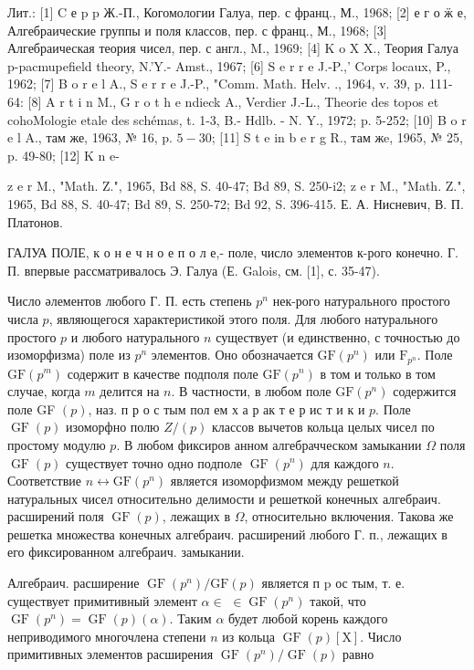 \documentclass[10pt]{article}
\begin{document}
Лит.: [1] C е p p Ж.-П., Когомологии Галуа, пер. с франц., М., 1968; [2] е г о ӝ е, Алгебраические группы и поля классов, пер. с франц., М., 1968; [3] Алгебраическая теория чисел, пер. с англ., M., 1969; [4] K o X X., Теория Галуа p-pacmupefield theory, N.'Y.- Amst., 1967; [6] S e r r e J.-P.,' Corps locaux, P., 1962; [7] B o r e l A., S e r r e J.-P., "Comm. Math. Helv. ., 1964, v. 39, p. 111-64: [8] A r t i n M., G r o t h e ndieck A., Verdier J.-L., Theorie des topos et cohoMologie etale des schémas, t. 1-3, B.- Hdlb. - N. Y., 1972; p. 5-252; [10] B o r e l A., там же, 1963, № 16, p. $5-30$; [11] S t e in b e r g R., там жe, 1965, № 25, p. 49-80; [12] K n e-

z e r M., "Math. Z.", 1965, Bd 88, S. 40-47; Bd 89, S. 250-i2; z e r M., "Math. Z.", 1965, Bd 88, S. 40-47; Bd 89, S. 250-72; Bd 92, S. 396-415. Е. А. Нисневич, В. П. Платонов.



ГАЛУА ПОЛЕ, к о н е ч н о е п о л е,- поле, число элементов к-рого конечно. Г. П. впервые рассматривалось Э. Галуа (Е. Galois, см. [1], с. 35-47).



Число әлементов любого Г. П. есть степень $p^{n}$ нек-рого натурального простого числа $p$, являющегося характеристикой этого поля. Для любого натурального простого $p$ и любого натурального $n$ существует (и единственно, с точностью до изоморфизма) поле из $p^{n}$ элементов. Оно обозначается $\mathrm{GF}\left(p^{n}\right)$ или $\mathrm{F}_{p^{n}}$. Поле $\mathrm{GF}\left(p^{m}\right)$ содержит в качестве подполя поле $\mathrm{GF}\left(p^{n}\right)$ в том и только в том случае, когда $m$ делится на $n$. В частности, в любом поле $\mathrm{GF}\left(p^{n}\right)$ содержится поле GF $(p)$, наз. п р о с тым пол ем х а р ак т е р ис т и к и $p$. Поле $\operatorname{GF}(p)$ изоморфно полю $Z /(p)$ классов вычетов кольца целых чисел по простому модулю $p$. В любом фиксиров анном алгебрачческом замыкании $\Omega$ поля $\operatorname{GF}(p)$ существует точно одно подполе $\operatorname{GF}\left(p^{n}\right)$ для каждого $n$. Соответствие $n \leftrightarrow \mathrm{GF}\left(p^{n}\right)$ является изоморфизмом между решеткой натуральных чисел относительно делимости и решеткой конечных алгебраич. расширений поля $\operatorname{GF}(p)$, лежащих в $\Omega$, относительно включения. Такова же решетка множества конечных алгебраич. расширений любого Г. п., лежащих в его фиксированном алгебраич. замыкании.



Алгебраич. расширение $\operatorname{GF}\left(p^{n}\right) / \mathrm{GF}(p)$ является п $\mathrm{p}$ ос тым, т. е. существует примитивный элемент $\alpha \in$ $\in \operatorname{GF}\left(p^{n}\right)$ такой, что $\operatorname{GF}\left(p^{n}\right)=\operatorname{GF}(p)(\alpha)$. Таким $\alpha$ будет любой корень каждого неприводимого многочлена степени $n$ из кольца $\operatorname{GF}(p)[\mathrm{X}]$. Число примитивных элементов расширения $\operatorname{GF}\left(p^{n}\right) / \operatorname{GF}(p)$ равно
\end{document}
